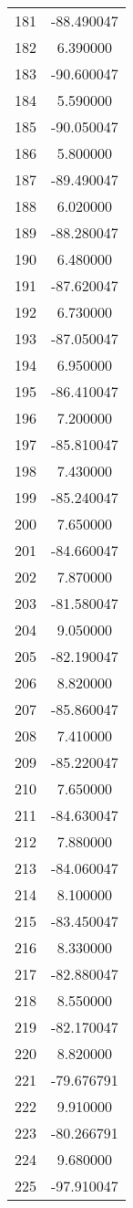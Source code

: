 \documentclass[12pt]{article}
\begin{document}
\begin{longtable}{@{}cc@{}}
181 & -88.490047 \\
182 & 6.390000 \\
183 & -90.600047 \\
184 & 5.590000 \\
185 & -90.050047 \\
186 & 5.800000 \\
187 & -89.490047 \\
188 & 6.020000 \\
189 & -88.280047 \\
190 & 6.480000 \\
191 & -87.620047 \\
192 & 6.730000 \\
193 & -87.050047 \\
194 & 6.950000 \\
195 & -86.410047 \\
196 & 7.200000 \\
197 & -85.810047 \\
198 & 7.430000 \\
199 & -85.240047 \\
200 & 7.650000 \\
201 & -84.660047 \\
202 & 7.870000 \\
203 & -81.580047 \\
204 & 9.050000 \\
205 & -82.190047 \\
206 & 8.820000 \\
207 & -85.860047 \\
208 & 7.410000 \\
209 & -85.220047 \\
210 & 7.650000 \\
211 & -84.630047 \\
212 & 7.880000 \\
213 & -84.060047 \\
214 & 8.100000 \\
215 & -83.450047 \\
216 & 8.330000 \\
217 & -82.880047 \\
218 & 8.550000 \\
219 & -82.170047 \\
220 & 8.820000 \\
221 & -79.676791 \\
222 & 9.910000 \\
223 & -80.266791 \\
224 & 9.680000 \\
225 & -97.910047 \\

\end{longtable}
\end{document}
